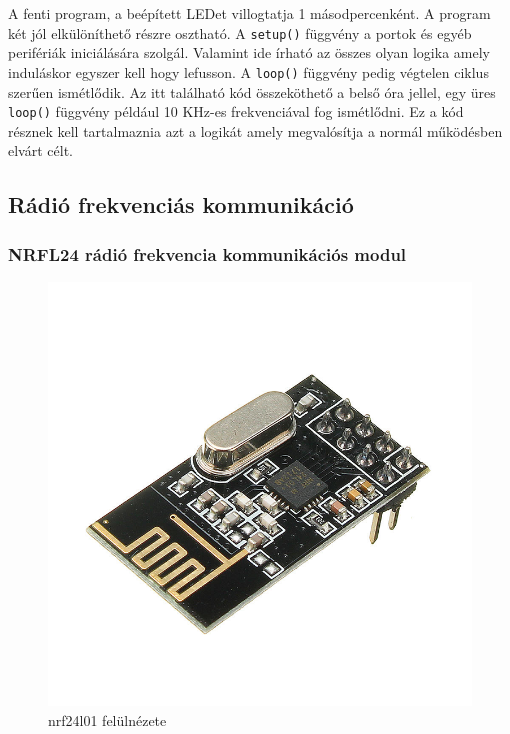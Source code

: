 \documentclass[a4paper,12pt]{article}
\begin{document}
A fenti program, a beépített LEDet villogtatja 1 másodpercenként.
A program két jól elkülöníthető részre osztható. 
A \texttt{setup()} függvény a portok és egyéb perifériák iniciálására szolgál. 
Valamint ide írható az összes olyan logika amely induláskor egyszer kell hogy lefusson.
A \texttt{loop()} függvény pedig végtelen ciklus szerűen ismétlődik. 
Az itt található kód összeköthető a belső óra jellel, egy üres \texttt{loop()} függvény például 10 KHz-es frekvenciával fog ismétlődni.
Ez a kód résznek kell tartalmaznia azt a logikát amely megvalósítja a normál működésben elvárt célt.

\subsection{Rádió frekvenciás kommunikáció}\label{sec:rftcomm}
\subsubsection{NRFL24 rádió frekvencia kommunikációs modul}

\begin{figure}
	\vspace{-20pt}
    \centering
    \includegraphics[scale=0.25]{images/nrf24l01_overview.png}
    \caption[nrf24l01 felülnézet]{nrf24l01 felülnézete}
    \label{fig:nrf24l01overview}
\end{figure}
\end{document}
